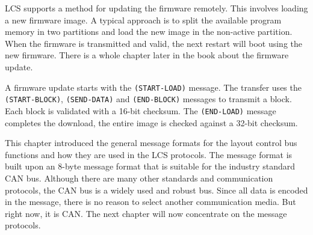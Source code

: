 
LCS supports a method for updating the firmware remotely. This involves loading a new firmware image. A typical approach is to split the available program memory in two partitions and load the new image in the non-active partition. When the firmware is transmitted and valid, the next restart will boot using the new firmware. There is a whole chapter later in the book about the firmware update.

\begin{table}[ht!]
    \centering 
\end{table}

A firmware update starts with the \texttt{(START-LOAD)} message. The transfer uses the \texttt{(START-BLOCK)}, \texttt{(SEND-DATA)} and \texttt{(END-BLOCK)} messages to transmit a block. Each block is validated with a 16-bit checksum. The \texttt{(END-LOAD)} message completes the download, the entire image is checked against a 32-bit checksum.


This chapter introduced the general message formats for the layout control bus functions and how they are used in the LCS protocols. The message format is built upon an 8-byte message format that is suitable for the industry standard CAN bus. Although there are many other standards and communication protocols, the CAN bus is a widely used and robust bus. Since all data is encoded in the message, there is no reason to select another communication media. But right now, it is CAN. The next chapter will now concentrate on the message protocols.
